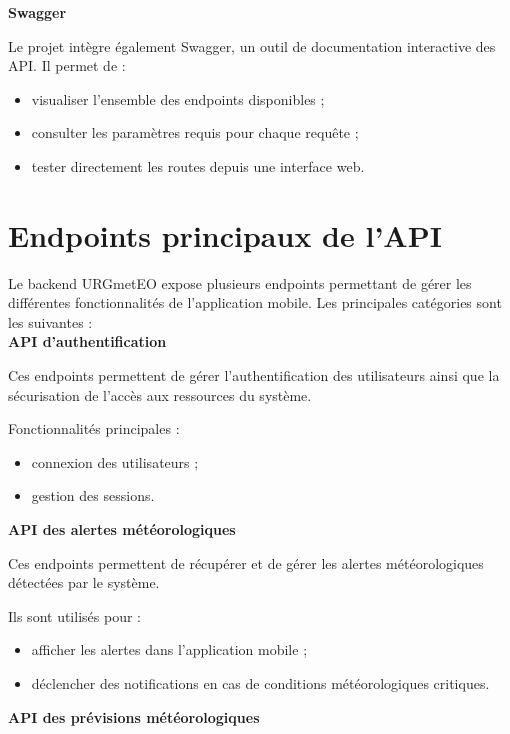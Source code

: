 \noindent \textbf{Swagger}  

\noindent Le projet intègre également Swagger, un outil de documentation interactive des API. Il permet de :
\begin{itemize}
\item visualiser l’ensemble des endpoints disponibles ;
\item consulter les paramètres requis pour chaque requête ;
\item tester directement les routes depuis une interface web.
\end{itemize}





\section{Endpoints principaux de l’API}

\noindent Le backend URGmetEO expose plusieurs endpoints permettant de gérer les différentes fonctionnalités de l’application mobile. Les principales catégories sont les suivantes :\\

\noindent \textbf{API d’authentification}  

\noindent Ces endpoints permettent de gérer l’authentification des utilisateurs ainsi que la sécurisation de l’accès aux ressources du système.

\noindent Fonctionnalités principales :
\begin{itemize}
\item connexion des utilisateurs ;
\item gestion des sessions.\\
\end{itemize}

\noindent \textbf{API des alertes météorologiques}  

\noindent Ces endpoints permettent de récupérer et de gérer les alertes météorologiques détectées par le système.

\noindent Ils sont utilisés pour :
\begin{itemize}
\item afficher les alertes dans l’application mobile ;
\item déclencher des notifications en cas de conditions météorologiques critiques.\\
\end{itemize}

\noindent \textbf{API des prévisions météorologiques}  

